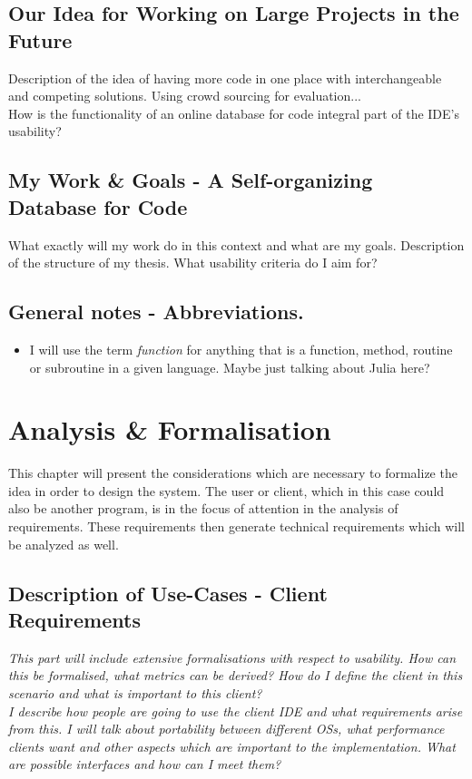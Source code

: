 \documentclass[twoside, 11pt]{scrartcl}
\begin{document}
\subsection{Our Idea for Working on Large Projects in the Future}
Description of the idea of having more code in one place with interchangeable and competing solutions. Using crowd sourcing for evaluation...\\
How is the functionality of an online database for code integral part of the IDE's usability?\\

\subsection{My Work \& Goals - A Self-organizing Database for Code}
What exactly will my work do in this context and what are my goals. 
Description of the structure of my thesis. What usability criteria do I aim for?\\

\subsection*{General notes - Abbreviations.}
\begin{itemize}
	\item I will use the term \textit{function} for anything that is a function, method, routine or subroutine in a given language. Maybe just talking about Julia here?
\end{itemize}



\section{Analysis \& Formalisation}
\label{sec:analysis}
This chapter will present the considerations which are necessary to formalize the idea in order to design the system. The user or client, which in this case could also be another program,  is in the focus of attention in the analysis of requirements. These requirements then generate technical requirements which will be analyzed as well.

\subsection{Description of Use-Cases - Client Requirements}
\label{sec:clientReq}
\textit{This part will include extensive formalisations with respect to usability. How can this be formalised, what metrics can be derived? How do I define the client in this scenario and what is important to this client?\\
I describe how people are going to use the client IDE and what requirements arise from this. I will talk about portability between different OSs, what performance clients want and other aspects which are important to the implementation. What are possible interfaces and how can I meet them?}
\end{document}
